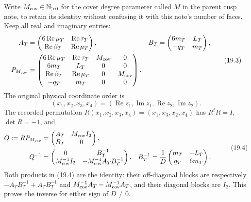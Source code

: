 \documentclass[
]{article}
\begin{document}
Write \(M_{\rm cov}\in\mathbb N_{>0}\) for the cover degree parameter
called \(M\) in the parent cusp note, to retain its identity without
confusing it with this note's number of faces. Keep all real and
imaginary entries: \[
\begin{aligned}
A_T&=\begin{pmatrix}6\operatorname{Re}\mu_T&\operatorname{Re}\tau_T\\
 \operatorname{Re}\beta_T&\operatorname{Re}\mu_T\end{pmatrix},
&
B_T&=\begin{pmatrix}6m_T&L_T\\-q_T&m_T\end{pmatrix},\\
P_{M_{\rm cov}}&=
\begin{pmatrix}
6\operatorname{Re}\mu_T&\operatorname{Re}\tau_T&M_{\rm cov}&0\\
6m_T&L_T&0&0\\
\operatorname{Re}\beta_T&\operatorname{Re}\mu_T&0&M_{\rm cov}\\
-q_T&m_T&0&0
\end{pmatrix}.
\end{aligned}                                                    \tag{19.3}
\] The original physical coordinate order is \[
(x_1,x_2,x_3,x_4)=(\operatorname{Re}z_1,\operatorname{Im}z_1,
\operatorname{Re}z_2,\operatorname{Im}z_2).
\] The recorded permutation \(R(x_1,x_2,x_3,x_4)=(x_1,x_3,x_2,x_4)\) has
\(R^tR=I\), \(\det R=-1\), and \[
\begin{aligned}
Q:=RP_{M_{\rm cov}}&=\begin{pmatrix}A_T&M_{\rm cov}I_2\\B_T&0\end{pmatrix},\\
Q^{-1}&=\begin{pmatrix}0&B_T^{-1}\\
 M_{\rm cov}^{-1}I_2&-M_{\rm cov}^{-1}A_TB_T^{-1}\end{pmatrix},
&
B_T^{-1}&=\frac1D\begin{pmatrix}m_T&-L_T\\q_T&6m_T\end{pmatrix}.
\end{aligned}                                                    \tag{19.4}
\] Both products in (19.4) are the identity: their off-diagonal blocks
are respectively \(-A_TB_T^{-1}+A_TB_T^{-1}\) and
\(M_{\rm cov}^{-1}A_T-M_{\rm cov}^{-1}A_T\), and their diagonal blocks
are \(I_2\). This proves the inverse for either sign of \(D\ne0\).
\end{document}
